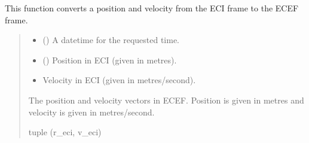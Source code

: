 \documentclass[letterpaper,10pt,english]{sphinxmanual}
\begin{document}

\begin{fulllineitems}
\label{\detokenize{modules/util/transformations:qnav.util.transformations.ecef2eci}}
\pysigstartsignatures
{}
\pysigstopsignatures
\sphinxAtStartPar
This function converts a position and velocity from the ECI frame to the
ECEF frame.
\begin{quote}\begin{description}
\begin{itemize}
\item {} 
\sphinxAtStartPar
{} () \textendash{} A datetime for the requested time.

\item {} 
\sphinxAtStartPar
{} (\sphinxstyleliteralemphasis{\sphinxupquote{ (}}\sphinxstyleliteralemphasis{\sphinxupquote{)}}) \textendash{} Position in ECI (given in metres).

\item {} 
\sphinxAtStartPar
{} \textendash{} Velocity in ECI (given in metres/second).

\end{itemize}

\sphinxAtStartPar
The position and velocity vectors in ECEF. Position is given in
metres and velocity is given in metres/second.

\sphinxAtStartPar
tuple (r\_eci, v\_eci)

\end{description}\end{quote}

\end{fulllineitems}
\end{document}

